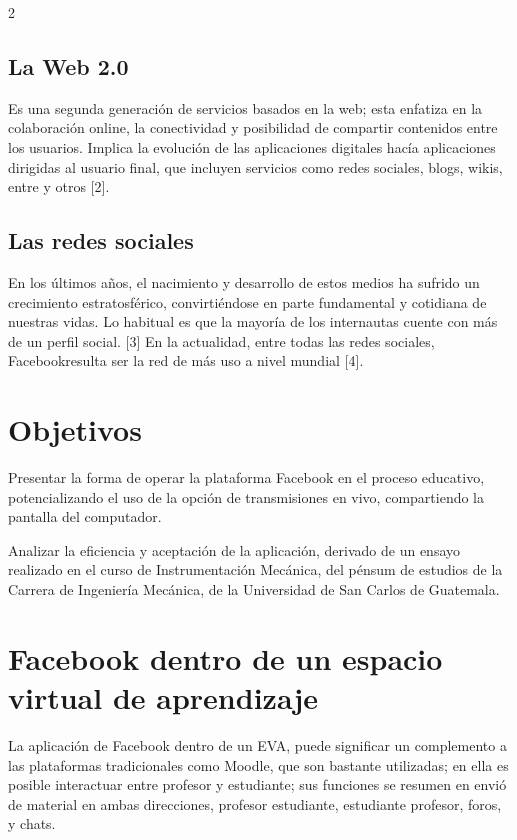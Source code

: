 \documentclass[11pt,spanish,Letterpaper,openany]{book}
\begin{document}
\begin {multicols}{2}
\hypertarget{la-web-2.0}{%
\subsection{La Web 2.0}\label{la-web-2.0}}

Es una segunda generación de servicios basados en la web; esta enfatiza en la colaboración online, la conectividad y posibilidad de compartir contenidos entre los usuarios. Implica la evolución de las aplicaciones digitales hacía aplicaciones dirigidas al usuario final, que incluyen servicios como redes sociales, blogs, wikis, entre y otros {[}2{]}.

\hypertarget{las-redes-sociales}{%
\subsection{Las redes sociales}\label{las-redes-sociales}}

En los últimos años, el nacimiento y desarrollo de estos medios ha sufrido un crecimiento estratosférico, convirtiéndose en parte fundamental y cotidiana de nuestras vidas. Lo habitual es que la mayoría de los internautas cuente con más de un perfil social. {[}3{]} En la actualidad, entre todas las redes sociales, Facebookresulta ser la red de más uso a nivel mundial {[}4{]}.

\hypertarget{objetivos-1}{%
\section{Objetivos}\label{objetivos-1}}

Presentar la forma de operar la plataforma Facebook en el proceso educativo, potencializando el uso de la opción de transmisiones en vivo, compartiendo la pantalla del computador.

Analizar la eficiencia y aceptación de la aplicación, derivado de un ensayo realizado en el curso de Instrumentación Mecánica, del pénsum de estudios de la Carrera de Ingeniería Mecánica, de la Universidad de San Carlos de Guatemala.

\hypertarget{facebook-dentro-de-un-espacio-virtual-de-aprendizaje}{%
\section{Facebook dentro de un espacio virtual de aprendizaje}\label{facebook-dentro-de-un-espacio-virtual-de-aprendizaje}}

La aplicación de Facebook dentro de un EVA, puede significar un complemento a las plataformas tradicionales como Moodle, que son bastante utilizadas; en ella es posible interactuar entre profesor y estudiante; sus funciones se resumen en envió de material en ambas direcciones, profesor estudiante, estudiante profesor, foros, y chats.


\end{multicols}
\end{document}

